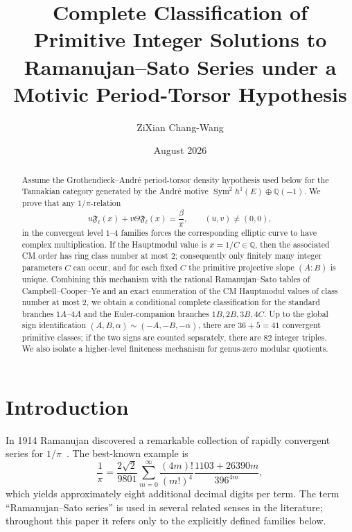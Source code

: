 \documentclass[11pt,a4paper]{amsart} %
\title{Complete Classification of Primitive Integer Solutions to Ramanujan--Sato Series under a Motivic Period-Torsor Hypothesis}
\author{ZiXian Chang-Wang}
\date{August 2026}
\theoremstyle{definition}
\newcommand{\Q}{\mathbb Q}
\newcommand{\Sym}{\operatorname{Sym}}
\begin{document}
\begin{abstract}
Assume the Grothendieck--André period-torsor density hypothesis used
below for the Tannakian category generated by the André motive
\(\Sym^2 h^1(E)\oplus\Q(-1)\). We prove that any
\(1/\pi\)-relation
\[
u{\mathfrak F}_\ell(x)+v\Theta{\mathfrak F}_\ell(x)=\frac{\beta}{\pi},
\qquad (u,v)\ne(0,0),
\]
in the convergent level \(1\)--\(4\) families forces the corresponding
elliptic curve to have complex multiplication. If the Hauptmodul value is
\(x=1/C\in\Q\), then the associated CM order has ring class number at most
\(2\); consequently only finitely many integer parameters \(C\) can occur,
and for each fixed \(C\) the primitive projective slope \((A:B)\) is unique.
Combining this mechanism with the rational Ramanujan--Sato tables of
Campbell--Cooper--Ye and an exact enumeration of the CM Hauptmodul values of
class number at most \(2\), we obtain a conditional complete classification
for the standard branches \(1A\)--\(4A\) and the Euler-companion branches
\(1B,2B,3B,4C\). Up to the global sign identification
\((A,B,\alpha)\sim(-A,-B,-\alpha)\), there are \(36+5=41\) convergent
primitive classes; if the two signs are counted separately, there are \(82\)
integer triples. We also isolate a higher-level finiteness mechanism for
genus-zero modular quotients.
\end{abstract}
\maketitle
\tableofcontents
\section{Introduction}

In 1914 Ramanujan discovered a remarkable collection of rapidly convergent
series for \(1/\pi\)~\cite{Ram}. The best-known example is
\[
\frac1\pi =
\frac{2\sqrt{2}}{9801}
\sum_{m=0}^\infty
\frac{(4m)!}{(m!)^4}
\frac{1103+26390m}{396^{4m}},
\tag{\(\star\)}
\]
which yields approximately eight additional decimal digits per term. The term
``Ramanujan--Sato series'' is used in several related senses in the
literature; throughout this paper it refers only to the explicitly defined
families below.
\end{document}
